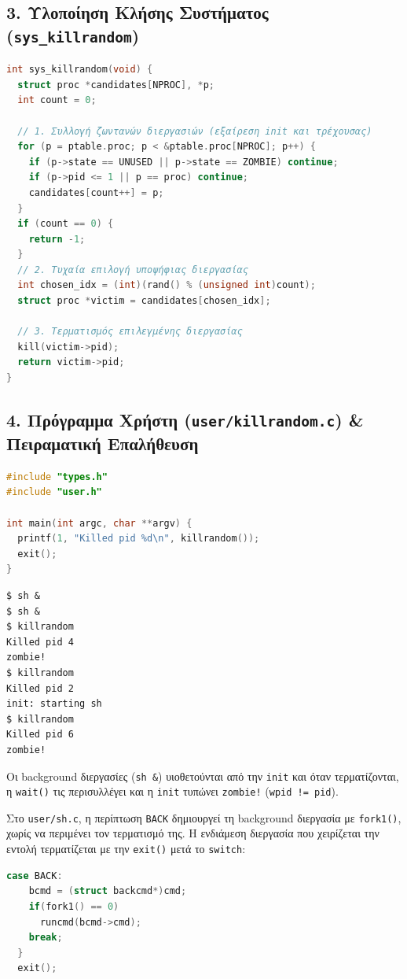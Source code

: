 \documentclass[11pt,a4paper]{article}
\begin{document}
\clearpage
\subsection*{3. Υλοποίηση Κλήσης Συστήματος (\texttt{sys\_killrandom})}
\begin{lstlisting}[language=C, caption={Υλοποίηση sys\_killrandom στο kernel/sysproc.c}]
int sys_killrandom(void) {
  struct proc *candidates[NPROC], *p;
  int count = 0;

  // 1. Συλλογή ζωντανών διεργασιών (εξαίρεση init και τρέχουσας)
  for (p = ptable.proc; p < &ptable.proc[NPROC]; p++) {
    if (p->state == UNUSED || p->state == ZOMBIE) continue;
    if (p->pid <= 1 || p == proc) continue;
    candidates[count++] = p;
  }
  if (count == 0) {
    return -1;
  }
  // 2. Τυχαία επιλογή υποψήφιας διεργασίας
  int chosen_idx = (int)(rand() % (unsigned int)count);
  struct proc *victim = candidates[chosen_idx];

  // 3. Τερματισμός επιλεγμένης διεργασίας
  kill(victim->pid);
  return victim->pid;
}
\end{lstlisting}

\subsection*{4. Πρόγραμμα Χρήστη (\texttt{user/killrandom.c}) \& Πειραματική Επαλήθευση}
\begin{lstlisting}[language=C, caption={Πρόγραμμα χρήστη killrandom (user/killrandom.c)}]
#include "types.h"
#include "user.h"

int main(int argc, char **argv) {
  printf(1, "Killed pid %d\n", killrandom());
  exit();
}
\end{lstlisting}

\begin{lstlisting}[style=termstyle, caption={Δοκιμές τυχαίου τερματισμού διεργασιών στο τερματικό του xv6}]
$ sh &
$ sh &
$ killrandom
Killed pid 4
zombie!
$ killrandom
Killed pid 2
init: starting sh
$ killrandom
Killed pid 6
zombie!
\end{lstlisting}

Οι background διεργασίες (\texttt{sh \&}) υιοθετούνται από την \texttt{init} και όταν τερματίζονται, 
η \texttt{wait()} τις περισυλλέγει και η \texttt{init} τυπώνει \texttt{zombie!} (\texttt{wpid != pid}).

\noindent\begin{minipage}{\linewidth}
Στο \texttt{user/sh.c}, η περίπτωση \texttt{BACK} δημιουργεί τη background διεργασία με
\texttt{fork1()}, χωρίς να περιμένει τον τερματισμό της. Η ενδιάμεση διεργασία που
χειρίζεται την εντολή τερματίζεται με την \texttt{exit()} μετά το \texttt{switch}:
\begin{lstlisting}[language=C, caption={Απόσπασμα της runcmd στο user/sh.c}]
  case BACK:
    bcmd = (struct backcmd*)cmd;
    if(fork1() == 0)
      runcmd(bcmd->cmd);
    break;
  }
  exit();
\end{lstlisting}
\end{minipage}
\end{document}
